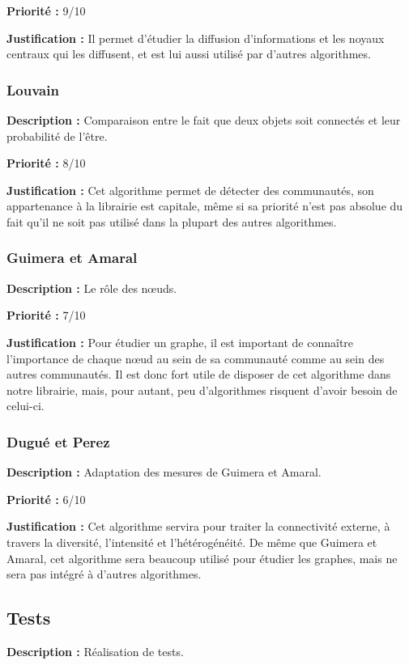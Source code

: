 \begin{titlepage}
{\textbf{Priorité :} 9/10

\textbf{Justification :} Il permet d'étudier la diffusion d'informations et les noyaux centraux qui les diffusent, et est lui aussi utilisé par d'autres algorithmes.
}

\subsubsection{Louvain}
{
\textbf{Description :} Comparaison entre le fait que deux objets soit connectés et leur probabilité de l'être.

\textbf{Priorité :} 8/10

\textbf{Justification :} Cet algorithme permet de détecter des communautés, son appartenance à la librairie est capitale, même si sa priorité n'est pas absolue du fait qu'il ne soit pas utilisé dans la plupart des autres algorithmes.
}

\subsubsection{Guimera et Amaral}
{
\textbf{Description :} Le rôle des nœuds.

\textbf{Priorité :} 7/10

\textbf{Justification :} Pour étudier un graphe, il est important de connaître l'importance de chaque nœud au sein de sa communauté comme au sein des autres communautés. Il est donc fort utile de disposer de cet algorithme dans notre librairie, mais, pour autant, peu d'algorithmes risquent d'avoir besoin de celui-ci.
}

\subsubsection{Dugué et Perez }
{
\textbf{Description :} Adaptation des mesures de Guimera et Amaral.

\textbf{Priorité :} 6/10

\textbf{Justification :} Cet algorithme servira pour traiter la connectivité externe, à travers la diversité, l'intensité et l'hétérogénéité. De même que Guimera et Amaral, cet algorithme sera beaucoup utilisé pour étudier les graphes, mais ne sera pas intégré à d'autres algorithmes.
}

\subsection{Tests}

{
\textbf{Description :} Réalisation de tests.

}
\end{titlepage}
